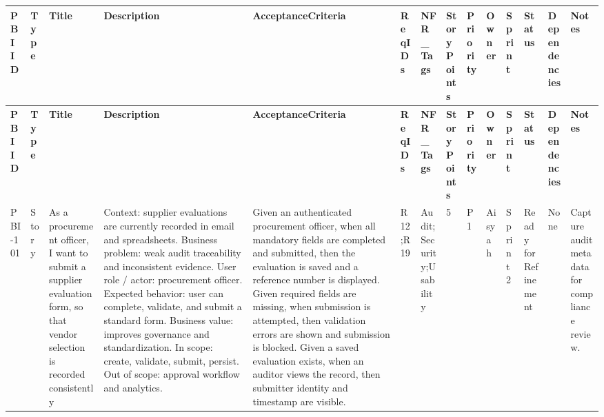 \documentclass[11pt,a4paper]{article}
\begin{document}
\begin{landscape}
\scriptsize
\renewcommand{\arraystretch}{1.2}

\begin{longtable}{|p{1.5cm}|p{1.3cm}|p{3.6cm}|p{4.6cm}|p{5.0cm}|p{1.5cm}|p{2.0cm}|p{1.1cm}|p{1.0cm}|p{1.7cm}|p{1.3cm}|p{1.8cm}|p{2.3cm}|p{3.0cm}|}
\hline
\textbf{PBI ID} &
\textbf{Type} &
\textbf{Title} &
\textbf{Description} &
\textbf{AcceptanceCriteria} &
\textbf{ReqIDs} &
\textbf{NFR\_Tags} &
\textbf{StoryPoints} &
\textbf{Priority} &
\textbf{Owner} &
\textbf{Sprint} &
\textbf{Status} &
\textbf{Dependencies} &
\textbf{Notes} \\
\hline
\endfirsthead

\hline
\textbf{PBI ID} &
\textbf{Type} &
\textbf{Title} &
\textbf{Description} &
\textbf{AcceptanceCriteria} &
\textbf{ReqIDs} &
\textbf{NFR\_Tags} &
\textbf{StoryPoints} &
\textbf{Priority} &
\textbf{Owner} &
\textbf{Sprint} &
\textbf{Status} &
\textbf{Dependencies} &
\textbf{Notes} \\
\hline
\endhead

PBI-101 &
Story &
As a procurement officer, I want to submit a supplier evaluation form, so that vendor selection is recorded consistently &
Context: supplier evaluations are currently recorded in email and spreadsheets. Business problem: weak audit traceability and inconsistent evidence. User role / actor: procurement officer. Expected behavior: user can complete, validate, and submit a standard form. Business value: improves governance and standardization. In scope: create, validate, submit, persist. Out of scope: approval workflow and analytics. &
Given an authenticated procurement officer, when all mandatory fields are completed and submitted, then the evaluation is saved and a reference number is displayed. Given required fields are missing, when submission is attempted, then validation errors are shown and submission is blocked. Given a saved evaluation exists, when an auditor views the record, then submitter identity and timestamp are visible. &
R12;R19 &
Audit;Security;Usability &
5 &
P1 &
Aisyah &
Sprint 2 &
Ready for Refinement &
None &
Capture audit metadata for compliance review. \\
\hline


\end{longtable}
\end{landscape}
\end{document}

